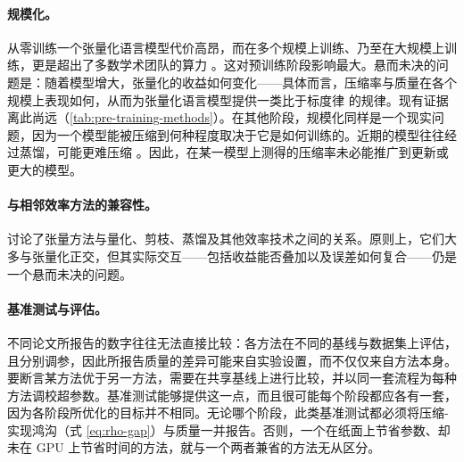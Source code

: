 \paragraph{规模化。} 

从零训练一个张量化语言模型代价高昂，而在多个规模上训练、乃至在大规模上训练，更是超出了多数学术团队的算力 \cite{chekalina2023ttm}。这对预训练阶段影响最大。悬而未决的问题是：随着模型增大，张量化的收益如何变化——具体而言，压缩率与质量在各个规模上表现如何，从而为张量化语言模型提供一类比于标度律 \cite{kaplan2020scalinglaws} 的规律。现有证据离此尚远（\cref{tab:pre-training-methods}）。在其他阶段，规模化同样是一个现实问题，因为一个模型能被压缩到何种程度取决于它是如何训练的。近期的模型往往经过蒸馏，可能更难压缩 \cite{solgi2025saten}。因此，在某一模型上测得的压缩率未必能推广到更新或更大的模型。

\paragraph{与相邻效率方法的兼容性。} 

 讨论了张量方法与量化、剪枝、蒸馏及其他效率技术之间的关系。原则上，它们大多与张量化正交，但其实际交互——包括收益能否叠加以及误差如何复合——仍是一个悬而未决的问题。


\paragraph{基准测试与评估。}

不同论文所报告的数字往往无法直接比较：各方法在不同的基线与数据集上评估，且分别调参，因此所报告质量的差异可能来自实验设置，而不仅仅来自方法本身。要断言某方法优于另一方法，需要在共享基线上进行比较，并以同一套流程为每种方法调校超参数。基准测试能够提供这一点，而且很可能每个阶段都应各有一套，因为各阶段所优化的目标并不相同。无论哪个阶段，此类基准测试都必须将压缩-实现鸿沟（式 \ref{eq:rho-gap}）与质量一并报告。否则，一个在纸面上节省参数、却未在 GPU 上节省时间的方法，就与一个两者兼省的方法无从区分。


